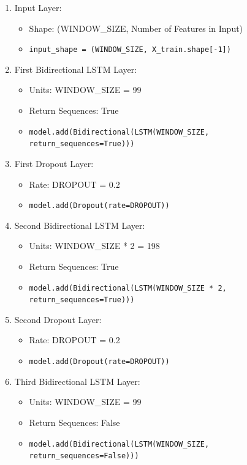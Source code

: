 \begin{enumerate}
    \item {Input Layer}:
    \begin{itemize}
        \item Shape: (WINDOW\_SIZE, Number of Features in Input)
        \item \texttt{input\_shape = (WINDOW\_SIZE, X\_train.shape[-1])}
    \end{itemize}

    \item {First Bidirectional LSTM Layer}:
    \begin{itemize}
        \item Units: WINDOW\_SIZE = 99
        \item Return Sequences: True
        \item \texttt{model.add(Bidirectional(LSTM(WINDOW\_SIZE, return\_sequences=True)))}
    \end{itemize}

    \item {First Dropout Layer}:
    \begin{itemize}
        \item Rate: DROPOUT = 0.2
        \item \texttt{model.add(Dropout(rate=DROPOUT))}
    \end{itemize}

    \item {Second Bidirectional LSTM Layer}:
    \begin{itemize}
        \item Units: WINDOW\_SIZE * 2 = 198
        \item Return Sequences: True
        \item \texttt{model.add(Bidirectional(LSTM(WINDOW\_SIZE * 2, return\_sequences=True)))}
    \end{itemize}

    \item {Second Dropout Layer}:
    \begin{itemize}
        \item Rate: DROPOUT = 0.2
        \item \texttt{model.add(Dropout(rate=DROPOUT))}
    \end{itemize}

    \item {Third Bidirectional LSTM Layer}:
    \begin{itemize}
        \item Units: WINDOW\_SIZE = 99
        \item Return Sequences: False
        \item \texttt{model.add(Bidirectional(LSTM(WINDOW\_SIZE, return\_sequences=False)))}
    \end{itemize}


\end{enumerate}
